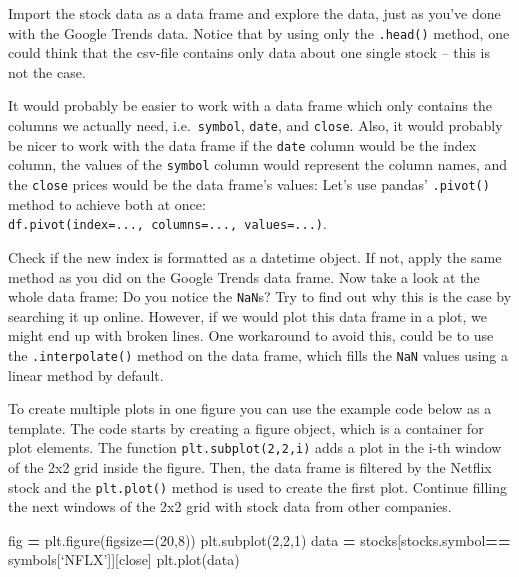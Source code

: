 \documentclass[
  11pt,
]{article}
\newenvironment{Shaded}{\begin{snugshade}}{\end{snugshade}}
\newcommand{\DecValTok}[1]{\textcolor[rgb]{0.00,0.00,0.81}{#1}}
\newcommand{\NormalTok}[1]{#1}
\newcommand{\OperatorTok}[1]{\textcolor[rgb]{0.81,0.36,0.00}{\textbf{#1}}}
\newcommand{\StringTok}[1]{\textcolor[rgb]{0.31,0.60,0.02}{#1}}
\newenvironment{tipsp}[1]
  {
  \begin{itemize}
  \footnotesize
  \renewcommand{\labelitemi}{
    \raisebox{-.7\height}[0pt][0pt]{
      {\setkeys{Gin}{width=3em,keepaspectratio}
        \texttt{[image: images/\#1.png]}}
    }
  }
  \setlength{\fboxsep}{1em}
  \begin{pbox}
  \item
  }
  {
  \end{pbox}
  \end{itemize}
  }
\begin{document}
\begin{tipsp}p

Import the stock data as a data frame and explore the data, just as you've done with the Google Trends data. Notice that by using only the \texttt{.head()} method, one could think that the csv-file contains only data about one single stock -- this is not the case.

It would probably be easier to work with a data frame which only contains the columns we actually need, i.e.~\texttt{symbol}, \texttt{date}, and \texttt{close}. Also, it would probably be nicer to work with the data frame if the \texttt{date} column would be the index column, the values of the \texttt{symbol} column would represent the column names, and the \texttt{close} prices would be the data frame's values: Let's use pandas' \texttt{.pivot()} method to achieve both at once: \texttt{df.pivot(index=...,\ columns=...,\ values=...)}.

Check if the new index is formatted as a datetime object. If not, apply the same method as you did on the Google Trends data frame.
Now take a look at the whole data frame: Do you notice the \texttt{NaN}s? Try to find out why this is the case by searching it up online. However, if we would plot this data frame in a plot, we might end up with broken lines. One workaround to avoid this, could be to use the \texttt{.interpolate()} method on the data frame, which fills the \texttt{NaN} values using a linear method by default.

To create multiple plots in one figure you can use the example code below as a template. The code starts by creating a figure object, which is a container for plot elements. The function \texttt{plt.subplot(2,2,i)} adds a plot in the i-th window of the 2x2 grid inside the figure. Then, the data frame is filtered by the Netflix stock and the \texttt{plt.plot()} method is used to create the first plot.
Continue filling the next windows of the 2x2 grid with stock data from other companies.

\begin{Shaded}
\begin{Highlighting}[]
\NormalTok{fig }\OperatorTok{=}\NormalTok{ plt.figure(figsize}\OperatorTok{=}\NormalTok{(}\DecValTok{20}\NormalTok{,}\DecValTok{8}\NormalTok{))}
\NormalTok{plt.subplot(}\DecValTok{2}\NormalTok{,}\DecValTok{2}\NormalTok{,}\DecValTok{1}\NormalTok{)}
\NormalTok{data }\OperatorTok{=}\NormalTok{ stocks[stocks.symbol}\OperatorTok{==}\NormalTok{ symbols[‘NFLX’]][}\StringTok{\textquotesingle{}close\textquotesingle{}}\NormalTok{]}
\NormalTok{plt.plot(data)}
\end{Highlighting}
\end{Shaded}


\end{tipsp}
\end{document}
